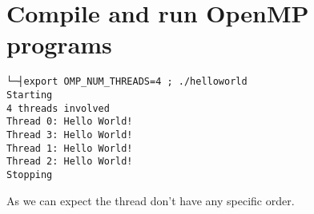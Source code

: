 \chapter{Compile and run OpenMP programs}

\begin{verbatim}
└─┤export OMP_NUM_THREADS=4 ; ./helloworld
Starting
4 threads involved
Thread 0: Hello World!
Thread 3: Hello World!
Thread 1: Hello World!
Thread 2: Hello World!
Stopping
\end{verbatim}

As we can expect the thread don't have any specific order.

